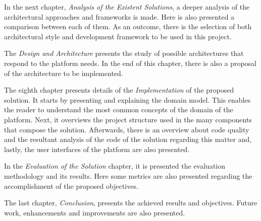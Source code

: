 In the next chapter, \textit{Analysis of the Existent Solutions}, a deeper analysis of the architectural approaches and frameworks is made. Here is also presented a comparison between each of them. As an outcome, there is the selection of both architectural style and development framework to be used in this project.
\par
The \textit{Design and Architecture} presents the study of possible architectures that respond to the platform needs. In the end of this chapter, there is also a proposal of the architecture to be implemented.
\par
The eighth chapter presents details of the \textit{Implementation} of the proposed solution. It starts by presenting and explaining the domain model. This enables the reader to understand the most common concepts of the domain of the platform. Next, it overviews the project structure used in the many components that compose the solution. Afterwards, there is an overview about code quality and the resultant analysis of the code of the solution regarding this matter and, lastly, the user interfaces of the platform are also presented.
\par
In the \textit{Evaluation of the Solution} chapter, it is presented the evaluation methodology and its results. Here some metrics are also presented regarding the accomplishment of the proposed objectives.
\par
The last chapter, \textit{Conclusion}, presents the achieved results and objectives. Future work, enhancements and improvements are also presented.